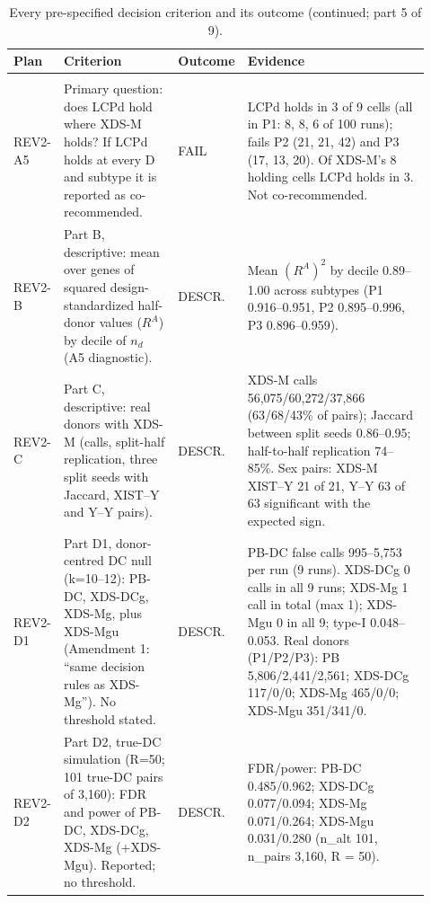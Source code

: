 \begin{table}[p]
\centering\scriptsize
\setlength{\tabcolsep}{2.5pt}\renewcommand{\arraystretch}{1.1}
\caption{Every pre-specified decision criterion and its outcome (continued; part 5 of 9).}\label{tab:criteria5}
\begin{tabular}{@{}>{\raggedright\arraybackslash}p{0.100\linewidth}>{\raggedright\arraybackslash}p{0.285\linewidth}>{\raggedright\arraybackslash}p{0.085\linewidth}>{\raggedright\arraybackslash}p{0.450\linewidth}@{}}
\toprule
Plan & Criterion & Outcome & Evidence \\
\midrule
\multicolumn{4}{@{}>{\raggedright\arraybackslash}p{0.90\linewidth}}{\textbf{Plan 3 (REV2\_PREREG), with amendment 1} (continued)} \\
\cmidrule(lr){1-4}
REV2-A5 & Primary question: does LCPd hold where XDS-M holds? If LCPd holds at every D and subtype it is reported as co-recommended. & FAIL & LCPd holds in 3 of 9 cells (all in P1: 8, 8, 6 of 100 runs); fails P2 (21, 21, 42) and P3 (17, 13, 20). Of XDS-M's 8 holding cells LCPd holds in 3. Not co-recommended. \\
REV2-B & Part B, descriptive: mean over genes of squared design-standardized half-donor values ($R^{A}$) by decile of $n_d$ (A5 diagnostic). & DESCR. & Mean $(R^{A})^{2}$ by decile 0.89--1.00 across subtypes (P1 0.916--0.951, P2 0.895--0.996, P3 0.896--0.959). \\
REV2-C & Part C, descriptive: real donors with XDS-M (calls, split-half replication, three split seeds with Jaccard, XIST--Y and Y--Y pairs). & DESCR. & XDS-M calls 56,075/60,272/37,866 (63/68/43\% of pairs); Jaccard between split seeds 0.86--0.95; half-to-half replication 74--85\%. Sex pairs: XDS-M XIST--Y 21 of 21, Y--Y 63 of 63 significant with the expected sign. \\
REV2-D1 & Part D1, donor-centred DC null (k=10--12): PB-DC, XDS-DCg, XDS-Mg, plus XDS-Mgu (Amendment 1: ``same decision rules as XDS-Mg''). No threshold stated. & DESCR. & PB-DC false calls 995--5,753 per run (9 runs). XDS-DCg 0 calls in all 9 runs; XDS-Mg 1 call in total (max 1); XDS-Mgu 0 in all 9; type-I 0.048--0.053. Real donors (P1/P2/P3): PB 5,806/2,441/2,561; XDS-DCg 117/0/0; XDS-Mg 465/0/0; XDS-Mgu 351/341/0. \\
REV2-D2 & Part D2, true-DC simulation (R=50; 101 true-DC pairs of 3,160): FDR and power of PB-DC, XDS-DCg, XDS-Mg (+XDS-Mgu). Reported; no threshold. & DESCR. & FDR/power: PB-DC 0.485/0.962; XDS-DCg 0.077/0.094; XDS-Mg 0.071/0.264; XDS-Mgu 0.031/0.280 (n\_alt 101, n\_pairs 3,160, R = 50). \\

\end{tabular}
\end{table}
